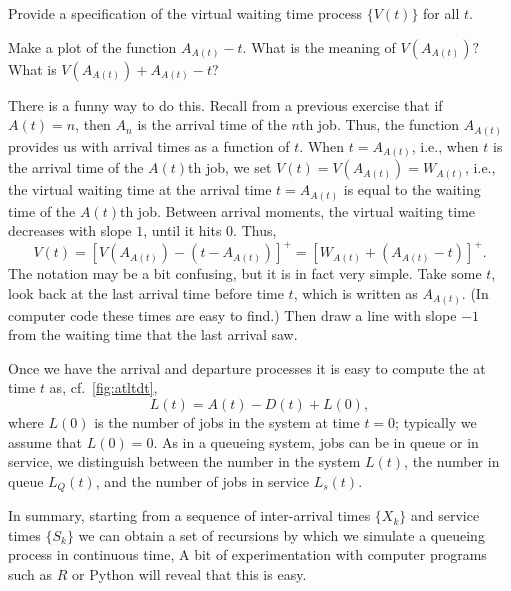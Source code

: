 \begin{exercise}
  Provide a specification of the virtual waiting time process $\{V(t)\}$ for
    all $t$.
    \begin{hint}Make a plot of the function $A_{A(t)}-t$. What is the meaning of $V(A_{A(t)})?$ What is
$V(A_{A(t)}) + A_{A(t)}-t$?
    \end{hint}
    \begin{solution}
      There is a funny way to do this.
      Recall from a previous exercise that if $A(t)=n$, then $A_n$ is the arrival time of the $n$th job.
      Thus, the function $A_{A(t)}$ provides us with arrival times as a function of $t$.
      When $t=A_{A(t)}$, i.e., when $t$ is the arrival time of the $A(t)$th job, we set $V(t) = V(A_{A(t)}) = W_{A(t)}$, i.e., the virtual waiting time at the arrival time $t=A_{A(t)}$ is equal to the waiting time of the $A(t)$th job.
      Between arrival moments, the virtual waiting time decreases with slope $1$, until it hits 0.
      Thus,
      \begin{equation*}
        V(t) 
= [V(A_{A(t)}) - (t-A_{A(t)})]^+= [W_{A(t)} + (A_{A(t)}-t)]^+.
      \end{equation*}
      The notation may be a bit confusing, but it is in fact very simple.
      Take some $t$, look back at the last arrival time before time $t$, which is written as $A_{A(t)}$.
      (In computer code these times are easy to find.)
      Then draw a line with slope $-1$ from the waiting time that the last arrival saw.
    \end{solution}
\end{exercise}

Once we have the arrival and departure processes it is easy to compute the  at time $t$ as, cf.~\cref{fig:atltdt},
\begin{equation}\label{eq:14}
  L(t) = A(t) - D(t) + L(0),
\end{equation}
where $L(0)$ is the number of jobs in the system at time $t=0$; typically we assume that $L(0)=0$.
As in a queueing system, jobs can be in queue or in service, we distinguish between the number in the system $L(t)$, the number in queue $L_Q(t)$, and the number of jobs in service $L_s(t)$.


In summary, starting from a sequence of inter-arrival times $\{X_k\}$ and service times $\{S_k\}$ we can obtain a set of recursions by which we simulate a queueing process in continuous time, A bit of experimentation with computer programs such as $R$ or Python will reveal that this is easy.

